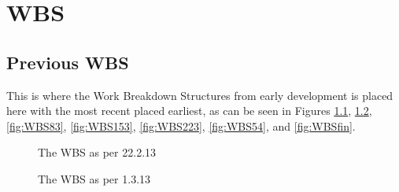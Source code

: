 
\appendix

\chapter{WBS}

\section{Previous WBS}
This is where the Work Breakdown Structures from early development is placed here with the most recent placed earliest, as can be seen in Figures \ref{fig:WBS222}, \ref{fig:WBS13}, \ref{fig:WBS83}, \ref{fig:WBS153}, \ref{fig:WBS223}, \ref{fig:WBS54}, and \ref{fig:WBSfin}.

\begin{figure}[p]
\setlength\fboxsep{0pt}
\setlength\fboxrule{1pt}\noindent{}
\caption{The WBS as per 22.2.13 }
\label{fig:WBS222}
\end{figure}

\begin{figure}[p]
\setlength\fboxsep{0pt}
\setlength\fboxrule{1pt}\noindent{}
\caption{The WBS as per 1.3.13}
\label{fig:WBS13}
\end{figure}


